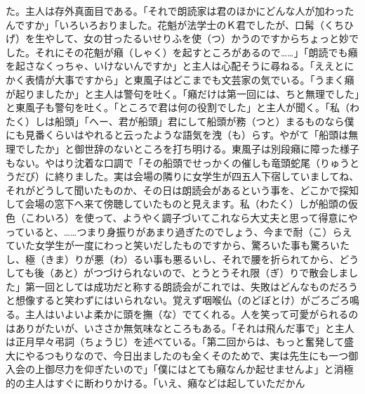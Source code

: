 \documentclass{book}
\begin{document}
た。主人は存外真面目である。「それで朗読家は君のほかにどんな人が加わったんですか」「いろいろおりました。花魁が法学士のＫ君でしたが、口髯（くちひげ）を生やして、女の甘ったるいせりふを使（つ）かうのですからちょっと妙でした。それにその花魁が癪（しゃく）を起すところがあるので\ldots{}\ldots{}」「朗読でも癪を起さなくっちゃ、いけないんですか」と主人は心配そうに尋ねる。「ええとにかく表情が大事ですから」と東風子はどこまでも文芸家の気でいる。「うまく癪が起りましたか」と主人は警句を吐く。「癪だけは第一回には、ちと無理でした」と東風子も警句を吐く。「ところで君は何の役割でした」と主人が聞く。「私（わたく）しは船頭」「へー、君が船頭」君にして船頭が務（つと）まるものなら僕にも見番くらいはやれると云ったような語気を洩（も）らす。やがて「船頭は無理でしたか」と御世辞のないところを打ち明ける。東風子は別段癪に障った様子もない。やはり沈着な口調で「その船頭でせっかくの催しも竜頭蛇尾（りゅうとうだび）に終りました。実は会場の隣りに女学生が四五人下宿していましてね、それがどうして聞いたものか、その日は朗読会があるという事を、どこかで探知して会場の窓下へ来て傍聴していたものと見えます。私（わたく）しが船頭の仮色（こわいろ）を使って、ようやく調子づいてこれなら大丈夫と思って得意にやっていると、\ldots{}\ldots{}つまり身振りがあまり過ぎたのでしょう、今まで耐（こ）らえていた女学生が一度にわっと笑いだしたものですから、驚ろいた事も驚ろいたし、極（きま）りが悪（わ）るい事も悪るいし、それで腰を折られてから、どうしても後（あと）がつづけられないので、とうとうそれ限（ぎ）りで散会しました」第一回としては成功だと称する朗読会がこれでは、失敗はどんなものだろうと想像すると笑わずにはいられない。覚えず咽喉仏（のどぼとけ）がごろごろ鳴る。主人はいよいよ柔かに頭を撫（な）でてくれる。人を笑って可愛がられるのはありがたいが、いささか無気味なところもある。「それは飛んだ事で」と主人は正月早々弔詞（ちょうじ）を述べている。「第二回からは、もっと奮発して盛大にやるつもりなので、今日出ましたのも全くそのためで、実は先生にも一つ御入会の上御尽力を仰ぎたいので」「僕にはとても癪なんか起せませんよ」と消極的の主人はすぐに断わりかける。「いえ、癪などは起していただかん
\end{document}

